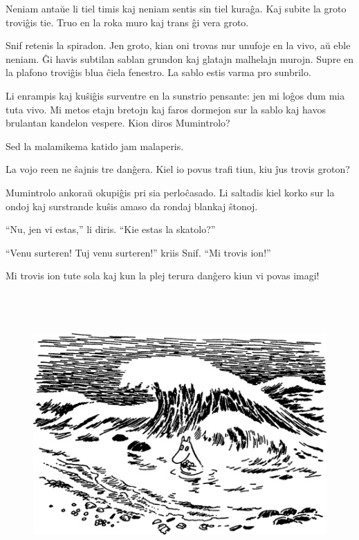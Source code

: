 Neniam antaŭe li tiel timis kaj neniam sentis sin tiel kuraĝa. Kaj subite la groto troviĝis tie. Truo en la roka muro kaj trans ĝi vera groto.

Snif retenis la spiradon. Jen groto, kian oni trovas nur unufoje en la vivo, aŭ eble neniam. Ĝi havis subtilan sablan grundon kaj glatajn malhelajn murojn. Supre en la plafono troviĝis blua ĉiela fenestro. La sablo estis varma pro sunbrilo.

Li enrampis kaj kuŝiĝis surventre en la sunstrio pensante: jen mi loĝos dum mia tuta vivo. Mi metos etajn bretojn kaj faros dormejon sur la sablo kaj havos brulantan kandelon vespere. Kion diros Mumintrolo?

Sed la malamikema katido jam malaperis.

\sectionbreak

La vojo reen ne ŝajnis tre danĝera. Kiel io povus trafi tiun, kiu ĵus trovis groton?

Mumintrolo ankoraŭ okupiĝis pri sia perloĉasado. Li saltadis kiel korko sur la ondoj kaj surstrande kuŝis amaso da rondaj blankaj ŝtonoj.

``Nu, jen vi estas,'' li diris. ``Kie estas la skatolo?''

``Venu surteren! Tuj venu surteren!'' kriis Snif. ``Mi trovis ion!''

Mi trovis ion tute sola kaj kun la plej terura danĝero kiun vi povas imagi!

\begin{figure}[htbp]
\centering
\includegraphics[width=450pt,height=307pt]{1-8.png}
\caption{}
\label{1-8}
\end{figure}

